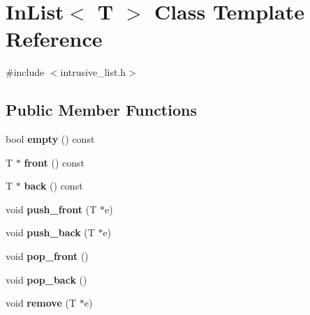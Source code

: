 \hypertarget{classInList}{\section{In\-List$<$ T $>$ Class Template Reference}
\label{classInList}
}


{\ttfamily \#include $<$intrusive\-\_\-list.\-h$>$}

\subsection*{Public Member Functions}
\begin{DoxyCompactItemize}
\item 
\hypertarget{classInList_a7a8424b88bf7ead661583383d3f6d482}{bool {\bfseries empty} () const }\label{classInList_a7a8424b88bf7ead661583383d3f6d482}

\item 
\hypertarget{classInList_a2964593cb6b7b50c5224737cac3e54ec}{T $\ast$ {\bfseries front} () const }\label{classInList_a2964593cb6b7b50c5224737cac3e54ec}

\item 
\hypertarget{classInList_a586c6530f61f9e616fab209f905c7de8}{T $\ast$ {\bfseries back} () const }\label{classInList_a586c6530f61f9e616fab209f905c7de8}

\item 
\hypertarget{classInList_a68363298d236385c7e8e8c61884750c2}{void {\bfseries push\-\_\-front} (T $\ast$e)}\label{classInList_a68363298d236385c7e8e8c61884750c2}

\item 
\hypertarget{classInList_a0d0666e7a9551ab6fcfa0b9163566ce6}{void {\bfseries push\-\_\-back} (T $\ast$e)}\label{classInList_a0d0666e7a9551ab6fcfa0b9163566ce6}

\item 
\hypertarget{classInList_ae4e75eaab71a02cbb7bebc00c4b2cd33}{void {\bfseries pop\-\_\-front} ()}\label{classInList_ae4e75eaab71a02cbb7bebc00c4b2cd33}

\item 
\hypertarget{classInList_a0cd4e2762a14cdce257d6d517f4fb5a2}{void {\bfseries pop\-\_\-back} ()}\label{classInList_a0cd4e2762a14cdce257d6d517f4fb5a2}

\item 
\hypertarget{classInList_af9772dd74412cf9f96d64bccf3e15ccc}{void {\bfseries remove} (T $\ast$e)}\label{classInList_af9772dd74412cf9f96d64bccf3e15ccc}


\end{DoxyCompactItemize}
